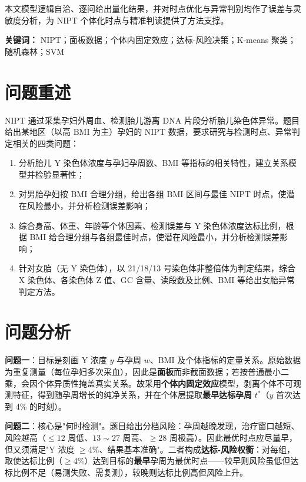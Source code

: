 \documentclass[12pt,a4paper]{article}
\begin{document}
本文模型逻辑自洽、逐问给出量化结果，并对时点优化与异常判别均作了误差与灵敏度分析，为 NIPT 个体化时点与精准判读提供了方法支撑。

\vspace{0.3em}
\noindent\textbf{关键词：} NIPT；面板数据；个体内固定效应；达标-风险决策；K-means 聚类；随机森林；SVM
\section{问题重述}
NIPT 通过采集孕妇外周血、检测胎儿游离 DNA 片段分析胎儿染色体异常。题目给出某地区（以高 BMI 为主）孕妇的 NIPT 数据，要求研究与检测时点、异常判定相关的四类问题：

\begin{enumerate}
\item 分析胎儿 Y 染色体浓度与孕妇孕周数、BMI 等指标的相关特性，建立关系模型并检验显著性；
\item 对男胎孕妇按 BMI 合理分组，给出各组 BMI 区间与最佳 NIPT 时点，使潜在风险最小，并分析检测误差影响；
\item 综合身高、体重、年龄等个体因素、检测误差与 Y 染色体浓度达标比例，根据 BMI 给合理分组与各组最佳时点，使潜在风险最小，并分析检测误差影响；
\item 针对女胎（无 Y 染色体），以 21/18/13 号染色体非整倍体为判定结果，综合 X 染色体、各染色体 Z 值、GC 含量、读段数及比例、BMI 等给出女胎异常判定方法。
\end{enumerate}

\section{问题分析}
\textbf{问题一}：目标是刻画 Y 浓度 $y$ 与孕周 $w$、BMI 及个体指标的定量关系。原始数据为重复测量（每位孕妇多次采血），因此是\textbf{面板}而非截面数据；若按普通最小二乘，会因个体异质性掩盖真实关系。故采用\textbf{个体内固定效应}模型，剥离个体不可观测特征，得到随孕周增长的纯净关系，并在个体层提取\textbf{最早达标孕周} $t^*$（$y$ 首次达到 4\% 的时刻）。

\textbf{问题二}：核心是"何时检测"。题目给出分档风险：孕周越晚发现，治疗窗口越短、风险越高（$\leq12$ 周低、$13\sim27$ 周高、$\geq28$ 周极高）。因此最优时点应尽量早，但又须满足"Y 浓度 $\geq4\%$、结果基本准确"。二者构成\textbf{达标-风险权衡}：对每组，取使达标比例（$\geq4\%$）达到目标的\textbf{最早}孕周为最优时点——较早则风险虽低但达标比例不足（易测失败、需复测），较晚则达标比例高但风险上升。
\end{document}

